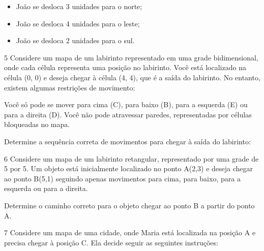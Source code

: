 \begin{itemize}
\item João se desloca 3 unidades para o norte; 
\item João se desloca 4 unidades para o leste; 
\item João se desloca 2 unidades para o sul.
\end{itemize}


\num{5} Considere um mapa de um labirinto representado em uma grade
bidimensional, onde cada célula representa uma posição no labirinto.
Você está localizado na célula (0, 0) e deseja chegar à célula (4, 4),
que é a saída do labirinto. No entanto, existem algumas restrições de
movimento:

Você só pode se mover para cima (C), para baixo (B), para a esquerda (E)
ou para a direita (D). Você não pode atravessar paredes, representadas
por células bloqueadas no mapa.

Determine a sequência correta de movimentos para chegar à saída do
labirinto:


\num{6} Considere um mapa de um labirinto retangular, representado por uma
grade de 5 por 5. Um objeto está inicialmente localizado no ponto A(2,3) e 
deseja chegar ao ponto B(5,1) seguindo apenas movimentos para
cima, para baixo, para a esquerda ou para a direita.

Determine o caminho correto para o objeto chegar ao ponto B a partir do
ponto A.


\num{7} Considere um mapa de uma cidade, onde Maria está localizada na
posição A e precisa chegar à posição C. Ela decide seguir as seguintes
instruções:

